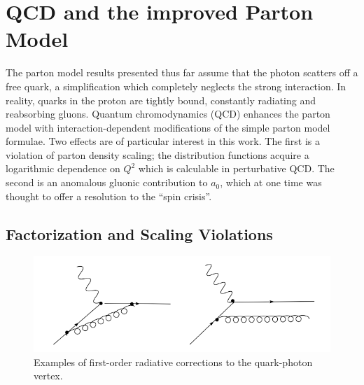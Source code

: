 

\section{QCD and the improved Parton Model}

The parton model results presented thus far assume that the photon scatters off
a free quark, a simplification which completely neglects the strong interaction.
In reality, quarks in the proton are tightly bound, constantly radiating and
reabsorbing gluons. Quantum chromodynamics (QCD) enhances the parton model with
interaction-dependent modifications of the simple parton model formulae. Two
effects are of particular interest in this work. The first is a violation of
parton density scaling; the distribution functions acquire a logarithmic
dependence on \(Q^2\) which is calculable in perturbative QCD. The second is an
anomalous gluonic contribution to \(a_0\), which at one time was thought to
offer a resolution to the ``spin crisis''. %

\subsection{Factorization and Scaling Violations}

\begin{figure}
  \includegraphics[width=1.0\textwidth]{figures/radiative-corrections}
  \caption{Examples of first-order radiative corrections to the quark-photon vertex.}
  \label{fig:radiative-corrections}
\end{figure}


